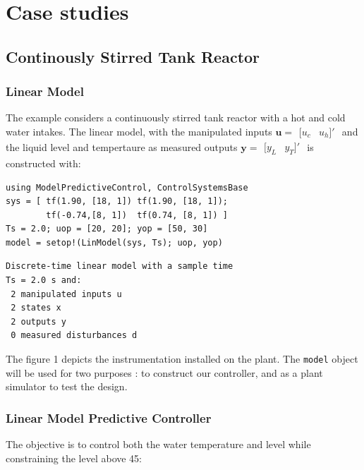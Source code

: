 \section{Case studies}

\subsection{Continously Stirred Tank Reactor}

\subsubsection{Linear Model}

The example considers a continuously stirred tank reactor with a hot and cold water intakes. The linear model, with the manipulated inputs $\mathbf{u}=\begin{smallmatrix}[
u_c & u_h]'\end{smallmatrix}$ and the liquid level and tempertaure as measured outputs $\mathbf{y}=\begin{smallmatrix}[y_L & y_T]'\end{smallmatrix}$ is constructed with:

\begin{verbatim}
using ModelPredictiveControl, ControlSystemsBase
sys = [ tf(1.90, [18, 1]) tf(1.90, [18, 1]);
        tf(-0.74,[8, 1])  tf(0.74, [8, 1]) ]
Ts = 2.0; uop = [20, 20]; yop = [50, 30]
model = setop!(LinModel(sys, Ts); uop, yop)
\end{verbatim}
\vspace{-26pt}
\begin{verbatim}
Discrete-time linear model with a sample time 
Ts = 2.0 s and:
 2 manipulated inputs u
 2 states x
 2 outputs y
 0 measured disturbances d
\end{verbatim}

The figure 1 depicts the instrumentation installed on the plant. The \texttt{model} object will be used for two purposes : to construct our controller, and as a plant simulator to test the design.

\subsubsection{Linear Model Predictive Controller}

The objective is to control both the water temperature and level while constraining the level above 45:

